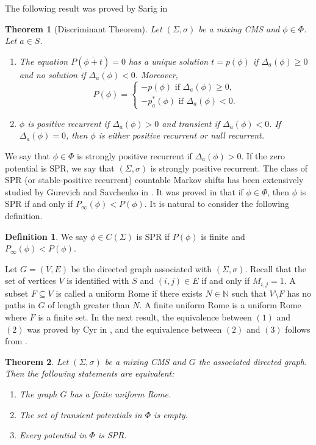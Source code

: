 \documentclass[letterpaper,11pt]{amsart}
\theoremstyle{plain}
\newtheorem{theorem}{Theorem}[section]
\theoremstyle{plain}
\theoremstyle{definition}
\newtheorem{definition}{Definition}[subsection]
\theoremstyle{remark}
\def\N{{\mathbb N}}
\begin{document}
The following result was proved by Sarig in \cite[Theorem 2]{sa2}
\begin{theorem}[Discriminant Theorem] \label{disc} Let $(\Sigma,\sigma)$ be a mixing CMS and $\phi\in \Phi$. Let $a\in S$.
\begin{enumerate}
\item The equation $P(\overline{\phi+t})=0$ has a unique solution $t=p(\phi)$ if $\Delta_a(\phi)\ge 0$ and no solution if $\Delta_a(\phi)<0$. Moreover,
\[ P(\phi)= \left\{
\begin{array}{ll}
      -p(\phi) \text{ if }\Delta_a(\phi)\ge 0,\\
-p^*_a(\phi) \text{ if } \Delta_a(\phi)<0.
\end{array} 
\right. \]
\item $\phi$ is positive recurrent if $\Delta_a(\phi)>0$ and transient if $\Delta_a(\phi)<0$. If $\Delta_a(\phi)=0$, then $\phi$ is either positive recurrent or null recurrent. 
\end{enumerate}
\end{theorem}


We say that $\phi\in \Phi$ is strongly positive recurrent if $\Delta_a(\phi)>0$.  If the zero potential is SPR, we say that $(\Sigma,\sigma)$ is strongly positive recurrent. The class of SPR (or stable-positive recurrent) countable Markov shifts has been extensively studied by Gurevich and Savchenko in \cite{gs}. It was proved in \cite[Theorem 8.2]{rs} that if $\phi\in\Phi$, then $\phi$ is SPR if and only if $P_\infty(\phi)<P(\phi)$. It is natural to consider the following definition.
\begin{definition}\label{def:sprn} We say $\phi\in C(\Sigma)$ is SPR if $P(\phi)$ is finite and $P_\infty(\phi)<P(\phi)$.
\end{definition}

Let $G=(V,E)$ be the directed graph associated with $(\Sigma,\sigma)$. Recall that the set of vertices $V$ is identified with $S$ and $(i,j)\in E$ if and only if $M_{i,j}=1$. A subset $F\subseteq V$ is called a uniform Rome if there exists $N\in\N$ such that $V\setminus F$ has no paths in $G$ of length greater than $N$. A finite uniform Rome is a uniform Rome where $F$ is a finite set. In the next result, the equivalence between $(1)$ and $(2)$ was proved by Cyr in \cite[Theorem 2.1]{c}, and the equivalence between $(2)$ and $(3)$ follows from \cite[Theorem 2.3]{cs}.

\begin{theorem}\label{hj} Let $(\Sigma,\sigma)$ be a mixing CMS and $G$ the associated directed graph. Then the following statements are equivalent:
\begin{enumerate}
\item The graph $G$ has a finite uniform Rome.
\item The set of transient potentials in $\Phi$  is empty.
\item Every potential in $\Phi$ is SPR. 
\end{enumerate}
\end{theorem}
\end{document}
